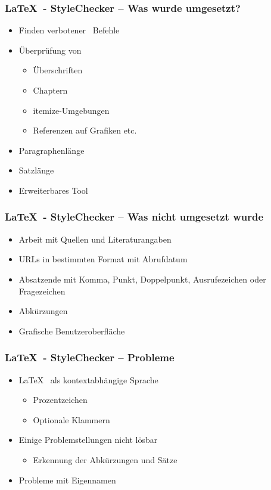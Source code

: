 \begin{frame}
\frametitle{\LaTeX~- StyleChecker -- Was wurde umgesetzt?}
\begin{block}{\vspace*{-3ex}}
	\begin{itemize}
	 	\item Finden \glqq verbotener\grqq~ Befehle
		\item Überprüfung von
		\begin{itemize}
			\item Überschriften
			\item Chaptern
			\item itemize-Umgebungen
			\item Referenzen auf Grafiken etc.
		\end{itemize}
		\item Paragraphenlänge
		\item Satzlänge
		\item Erweiterbares Tool
	\end{itemize}
\end{block}
\end{frame}
\begin{frame}
\frametitle{\LaTeX~- StyleChecker -- Was nicht umgesetzt wurde}
\begin{block}{\vspace*{-3ex}}
	\begin{itemize}
	 	\item Arbeit mit Quellen und Literaturangaben
		\item URLs in bestimmten Format mit Abrufdatum
		\item Absatzende mit Komma, Punkt, Doppelpunkt, Ausrufezeichen oder Fragezeichen
		\item Abkürzungen
		\item Grafische Benutzeroberfläche
	\end{itemize}
\end{block}
\end{frame}
\begin{frame}
\frametitle{\LaTeX~- StyleChecker -- Probleme}
\begin{block}{\vspace*{-3ex}}
	\begin{itemize}
	  \item \LaTeX~ als kontextabhängige Sprache
	  \begin{itemize}
		\item Prozentzeichen
		\item Optionale Klammern
	  \end{itemize}
	  \item Einige Problemstellungen nicht lösbar
	  \begin{itemize}
	  	\item Erkennung der Abkürzungen und Sätze
	  \end{itemize}
	\item Probleme mit Eigennamen
	\end{itemize}
\end{block}
\end{frame}
